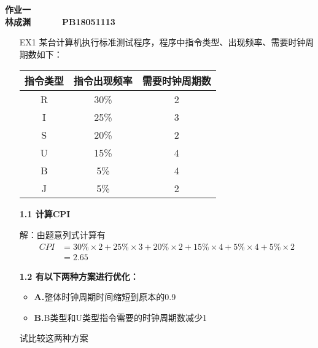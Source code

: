 \documentclass[12pt,a4paper,utf8]{ctexart}
\begin{document}


\begin{center}
\textbf{作业一}\\
\textbf{林成渊 ~~~~~ PB18051113 ~~~~~ \zhtoday}\\
\end{center}
\textit{}
\vspace{\baselineskip}

\begin{enumerate}
\item[EX1] %
某台计算机执行标准测试程序，程序中指令类型、出现频率、需要时钟周期数如下：
\begin{table}[h!]
	\begin{center}
		\begin{tabular}{|c|c|c|}
			\hline
			指令类型 & 指令出现频率 & 需要时钟周期数 \\
			\hline
			R & 30\% & 2 \\
			\hline
			I & 25\% & 3 \\
			\hline
			S & 20\% & 2 \\
			\hline
			U & 15\% & 4 \\
			\hline
			B & 5\% & 4 \\
			\hline
			J & 5\% & 2 \\
			\hline
		\end{tabular}
	\end{center}
\end{table}

\textbf{1.1 计算CPI}

解：由题意列式计算有
\begin{equation}
	\begin{aligned}
		CPI & = 30\% \times 2 + 25\% \times 3 + 20\%\times 2 + 15\% \times 4 + 5\% \times 4 + 5\% \times 2 \\
			& = 2.65
	\end{aligned}
	\nonumber
\end{equation}

	
\textbf{1.2 有以下两种方案进行优化：}
\begin{itemize}
	\item \textbf{A.}整体时钟周期时间缩短到原本的0.9
	\item \textbf{B.}B类型和U类型指令需要的时钟周期数减少1
\end{itemize}
试比较这两种方案


\end{enumerate}
\end{document}
